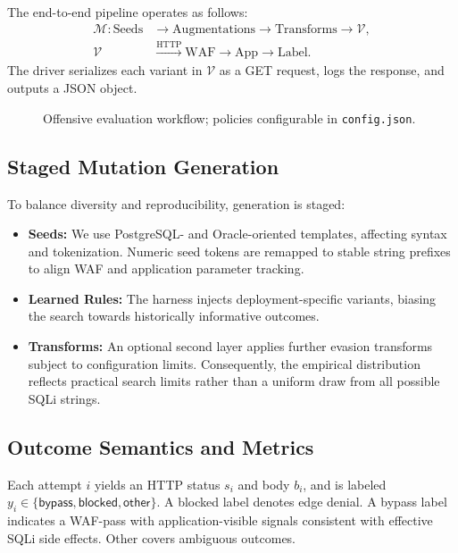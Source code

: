 The end-to-end pipeline operates as follows:
\begin{equation}
\label{eq:attack-pipeline}
\begin{aligned}
\mathcal{M}: \text{Seeds} &\rightarrow \text{Augmentations} \rightarrow \text{Transforms} \rightarrow \mathcal{V}, \\
\mathcal{V} &\xrightarrow{\text{HTTP}} \text{WAF} \rightarrow \text{App} \rightarrow \text{Label}.
\end{aligned}
\end{equation}
The driver serializes each variant in $\mathcal{V}$ as a GET request, logs the response, and outputs a JSON object.

\begin{figure}[t]
  \centering
  \caption{Offensive evaluation workflow; policies configurable in \texttt{config.json}.}
  \label{fig:pipeline}
\end{figure}

\subsection{Staged Mutation Generation}
To balance diversity and reproducibility, generation is staged:
\begin{itemize}
  \item \textbf{Seeds:} We use PostgreSQL- and Oracle-oriented templates, affecting syntax and tokenization. Numeric seed tokens are remapped to stable string prefixes to align WAF and application parameter tracking.
  \item \textbf{Learned Rules:} The harness injects deployment-specific variants, biasing the search towards historically informative outcomes.
  \item \textbf{Transforms:} An optional second layer applies further evasion transforms subject to configuration limits. Consequently, the empirical distribution reflects practical search limits rather than a uniform draw from all possible SQLi strings.
\end{itemize}

\subsection{Outcome Semantics and Metrics}
Each attempt $i$ yields an HTTP status $s_i$ and body $b_i$, and is labeled $y_i \in \{\textsf{bypass}, \textsf{blocked}, \textsf{other}\}$. A \textsf{blocked} label denotes edge denial. A \textsf{bypass} label indicates a WAF-pass with application-visible signals consistent with effective SQLi side effects. \textsf{Other} covers ambiguous outcomes.

